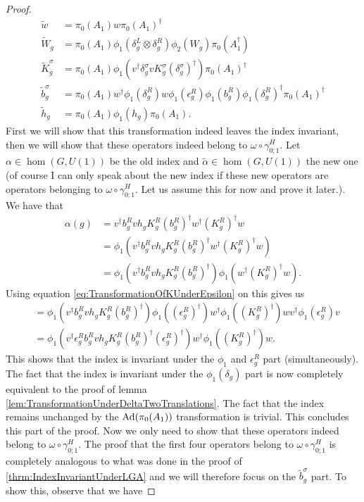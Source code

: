\documentclass[11pt,a4paper,twoside]{article}
\numberwithin{equation}{section}
\begin{document}
\begin{proof}
\begin{align}
		\tilde{w}&=\pi_0(A_1)w\pi_0(A_1)^\dagger\\
		\tilde{W}_g&=\pi_0(A_1)\phi_1(\delta^L_g\otimes\delta^R_g)\phi_2( W_g)\pi_0(A_1^\dagger)\\
		\tilde{K}_g^\sigma&=\pi_0(A_1)\phi_1(v^\dagger \delta_g^\sigma v K_g^\sigma (\delta_g^\sigma)^\dagger) \pi_0(A_1)^\dagger\\
		\tilde{b}_g^\sigma&=\pi_0(A_1)w^\dagger \phi_1(\delta_g^R)w \phi_1(\epsilon_g^R)\phi_1(b_g^R)\phi_1(\delta_g^R)^\dagger\pi_0(A_1)^\dagger\\
		\tilde{h}_g&=\pi_0(A_1)\phi_1(h_g)\pi_0(A_1).
	\end{align}
	First we will show that this transformation indeed leaves the index invariant, then we will show that these operators indeed belong to $\omega\circ\gamma^H_{0;1}$. Let $\alpha\in\hom(G,U(1))$ be the old index and $\tilde{\alpha}\in\hom(G,U(1))$ the new one (of course I can only speak about the new index if these new operators are operators belonging to $\omega\circ\gamma^H_{0;1}$. Let us assume this for now and prove it later.). We have that
\begin{align}
\alpha(g)&=v^\dagger b_g^R v h_g K_g^R (b_g^R)^\dagger w^\dagger (K_g^R)^\dagger w\\
&=\phi_1(v^\dagger b_g^R v h_g K_g^R (b_g^R)^\dagger w^\dagger (K_g^R)^\dagger w)\\
&=\phi_1(v^\dagger b_g^R v h_g K_g^R (b_g^R)^\dagger)\phi_1( w^\dagger (K_g^R)^\dagger w).
\end{align}
Using equation \eqref{eq:TransformationOfKUnderEpsilon} on this gives us
\begin{align}
&=\phi_1(v^\dagger b_g^R v h_g K_g^R (b_g^R)^\dagger)\phi_1((\epsilon_g^R)^\dagger)w^\dagger\phi_1(  (K_g^R)^\dagger )wv^\dagger \phi_1(\epsilon_g^R)v\\
&=\phi_1(v^\dagger \epsilon_g^R b_g^R v h_g K_g^R (b_g^R)^\dagger (\epsilon_g^R)^\dagger)w^\dagger\phi_1(  (K_g^R)^\dagger )w.
\end{align}
This shows that the index is invariant under the $\phi_1$ and $\epsilon^R_g$ part (simultaneously). The fact that the index is invariant under the $\phi_1(\delta_g)$ part is now completely equivalent to the proof of lemma \ref{lem:TransformationUnderDeltaTwoTranslations}. The fact that the index remains unchanged by the $\Ad{\pi_0(A_1)}$ transformation is trivial. This concludes this part of the proof. Now we only need to show that these operators indeed belong to $\omega\circ\gamma^H_{0;1}$. The proof that the first four operators belong to $\omega\circ\gamma^H_{0;1}$ is completely analogous to what was done in the proof of \ref{thrm:IndexInvariantUnderLGA} and we will therefore focus on the $\tilde{b}_g^\sigma$ part. To show this, observe that we have

\end{proof}
\end{document}
